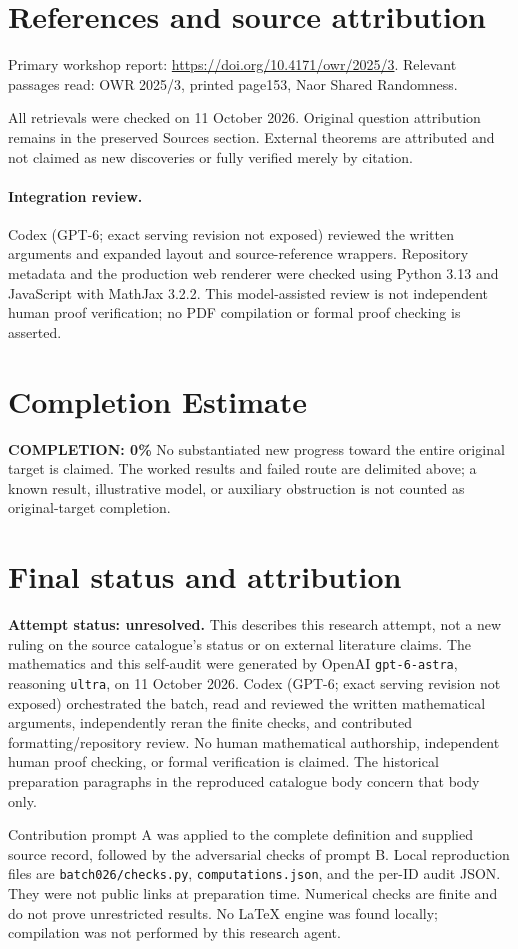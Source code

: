 \documentclass[11pt]{article}
\begin{document}
\section{References and source attribution}
Primary workshop report: \url{https://doi.org/10.4171/owr/2025/3}. Relevant passages read: OWR 2025/3, printed page153, Naor Shared Randomness.

All retrievals were checked on 11 October 2026. Original question attribution remains in the preserved Sources section. External theorems are attributed and not claimed as new discoveries or fully verified merely by citation.


\paragraph{Integration review.} Codex (GPT-6; exact serving revision not exposed) reviewed the written arguments and expanded layout and source-reference wrappers. Repository metadata and the production web renderer were checked using Python 3.13 and JavaScript with MathJax 3.2.2. This model-assisted review is not independent human proof verification; no PDF compilation or formal proof checking is asserted.

\section{Completion Estimate}
\noindent\textbf{COMPLETION: 0\%}
No substantiated new progress toward the entire original target is claimed. The worked results and failed route are delimited above; a known result, illustrative model, or auxiliary obstruction is not counted as original-target completion.

\section{Final status and attribution}
\textbf{Attempt status: unresolved.} This describes this research attempt, not a new ruling on the source catalogue's status or on external literature claims.
The mathematics and this self-audit were generated by OpenAI \texttt{gpt-6-astra}, reasoning \texttt{ultra}, on 11 October 2026. Codex (GPT-6; exact serving revision not exposed) orchestrated the batch, read and reviewed the written mathematical arguments, independently reran the finite checks, and contributed formatting/repository review. No human mathematical authorship, independent human proof checking, or formal verification is claimed. The historical preparation paragraphs in the reproduced catalogue body concern that body only.

Contribution prompt A was applied to the complete definition and supplied source record, followed by the adversarial checks of prompt B. Local reproduction files are \texttt{batch026/checks.py}, \texttt{computations.json}, and the per-ID audit JSON. They were not public links at preparation time. Numerical checks are finite and do not prove unrestricted results. No LaTeX engine was found locally; compilation was not performed by this research agent.
\end{document}
